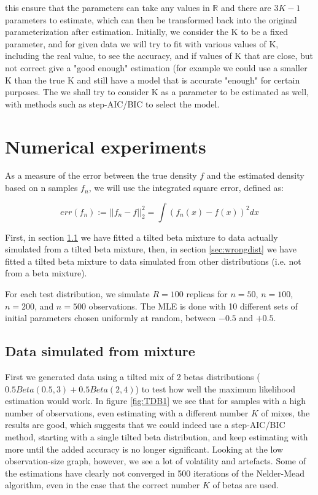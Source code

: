 \documentclass[10pt]{report}
\begin{document}
this ensure that the parameters can take any values in $\mathbb{R}$ and there are $3K-1$ parameters to estimate, which can then be transformed back into the original parameterization after estimation. Initially, we consider the K to be a fixed parameter, and for given data we will try to fit with various values of K, including the real value, to see the accuracy, and if values of K that are close, but not correct give a "good enough" estimation (for example we could use a smaller K than the true K and still have a model that is accurate "enough" for certain purposes. The we shall try to consider K as a parameter to be estimated as well, with methods such as step-AIC/BIC to select the model.

\section{Numerical experiments}



As a measure of the error between the true density $f$ and the estimated density based on n samples $f_n$, we will use the integrated square error, defined as:

$$
err(f_n) := ||f_n - f||^2_2 = \int(f_n(x)-f(x))^2dx
$$

First, in section \ref{sec:truedist} we have fitted a tilted beta mixture to data actually simulated from a tilted beta mixture, then, in section \ref{sec:wrongdist} we have fitted a tilted beta mixture to data simulated from other distributions (i.e. not from a beta mixture).

For each test distribution, we simulate $R=100$ replicas for $n=50$, $n=100$, $n=200$, and $n=500$ observations. The MLE is done with 10 different sets of initial parameters chosen uniformly at random, between $-0.5$ and $+0.5$.

\subsection{Data simulated from mixture}
\label{sec:truedist}

First we generated data using a tilted mix of 2 betas distributions ($0.5Beta(0.5,3) + 0.5Beta(2,4)$) to test how well the maximum likelihood estimation would work. In figure \ref{fig:TDB1} we see that for samples with a high number of observations, even estimating with a different number $K$ of mixes, the results are good, which suggests that we could indeed use a step-AIC/BIC method, starting with a single tilted beta distribution, and keep estimating with more until the added accuracy is no longer significant. Looking at the low observation-size graph, however, we see a lot of volatility and artefacts. Some of the estimations have clearly not converged in 500 iterations of the Nelder-Mead algorithm, even in the case that the correct number $K$ of betas are used.
\\
\end{document}
